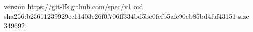 version https://git-lfs.github.com/spec/v1
oid sha256:b23611239929ec11403c26f0f706ff334bd5be0fefb5afe90cb85bd4faf43151
size 349692
